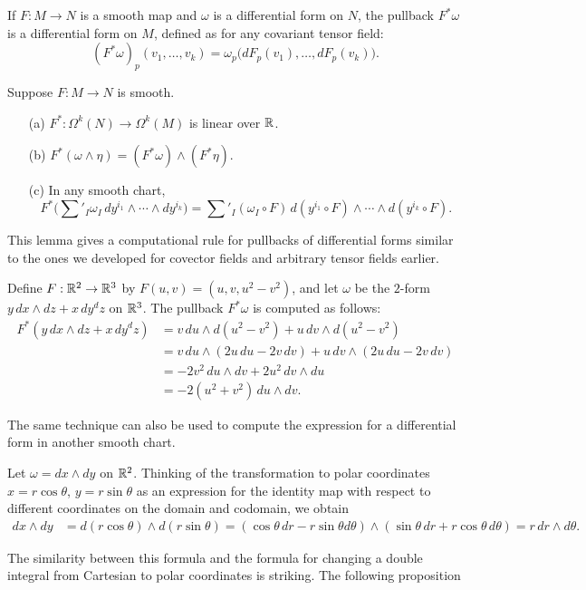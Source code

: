 If $F:M\to N$ is a smooth map and $\omega$ is a differential form on $N$, the pullback $F^*\omega$ is a differential form on $M$, defined as for any covariant tensor field:
\[(F^*\omega)_p(v_1,\dots,v_k)=\omega_p\big(dF_p(v_1),\dots,dF_p(v_k)\big).\]
\begin{lemma}\label{form pull back formula}
Suppose $F:M\to N$ is smooth.
\begin{itemize}
\item[(a)] $F^*:\Omega^k(N)\to\Omega^k(M)$ is linear over $\mathbb{R}$.
\item[(b)] $F^*(\omega\wedge\eta)=(F^*\omega)\wedge(F^*\eta)$.
\item[(c)] In any smooth chart,
\[F^*\Big(\sum'_{I}\omega_I\,dy^{i_1}\wedge\cdots\wedge dy^{i_k}\Big)=\sum'_{I}(\omega_I\circ F)\,d(y^{i_1}\circ F)\wedge\cdots\wedge d(y^{i_k}\circ F).\]
\end{itemize}
\end{lemma}
This lemma gives a computational rule for pullbacks of differential forms similar to the ones we developed for covector fields and arbitrary tensor fields earlier.
\begin{example}
Define $F:\mathbb{R}^2\to\mathbb{R}^3$ by $F(u,v)=(u,v,u^2-v^2)$, and let $\omega$ be the $2$-form $y\,dx\wedge dz+x\,dy^dz$ on $\mathbb{R}^3$. The pullback $F^*\omega$ is computed as follows:
\begin{align*}
F^*(y\,dx\wedge dz+x\,dy^dz)&=v\,du\wedge d(u^2-v^2)+u\,dv\wedge d(u^2-v^2)\\
&=v\,du\wedge(2u\,du-2v\,dv)+u\,dv\wedge(2u\,du-2v\,dv)\\
&=-2v^2\,du\wedge dv+2u^2\,dv\wedge du\\
&=-2(u^2+v^2)\,du\wedge dv.
\end{align*}
\end{example}
The same technique can also be used to compute the expression for a differential form in another smooth chart.
\begin{example}
Let $\omega=dx\wedge dy$ on $\mathbb{R}^2$. Thinking of the transformation to polar coordinates $x=r\cos\theta$, $y=r\sin\theta$ as an expression for the identity map with
respect to different coordinates on the domain and codomain, we obtain
\begin{align*}
dx\wedge dy&=d(r\cos\theta)\wedge d(r\sin\theta)=(\cos\theta\,dr-r\sin\theta d\theta)\wedge(\sin\theta\,dr+r\cos\theta\,d\theta)=r\,dr\wedge d\theta.
\end{align*}
\end{example}
The similarity between this formula and the formula for changing a double integral from Cartesian to polar coordinates is striking. The following proposition
